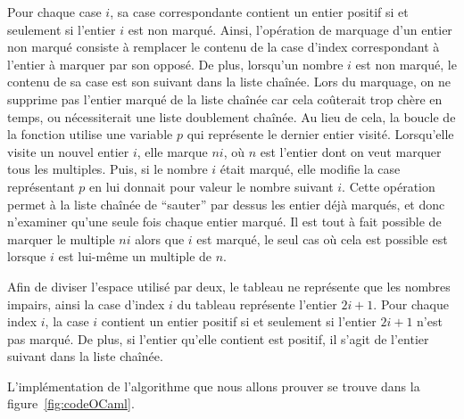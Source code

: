 \documentclass[a4paper]{easychair}
\begin{document}
Pour chaque case $i$, sa case correspondante contient un entier positif
si et seulement si l'entier $i$ est non marqué.
Ainsi, l'opération de marquage d'un entier non marqué consiste à remplacer le
contenu de la case d'index correspondant à l'entier à marquer par son opposé.
De plus, lorsqu'un nombre $i$ est non marqué, le contenu de sa case est son
suivant dans la liste chaînée.
Lors du marquage, on ne supprime pas l'entier marqué de la liste chaînée car
cela coûterait trop chère en temps, ou nécessiterait une liste doublement
chaînée. Au lieu de cela, la boucle de la fonction 
utilise une variable $p$ qui représente le dernier entier visité.
Lorsqu'elle visite un nouvel entier $i$, elle marque $ni$, où $n$ est
l'entier dont on veut marquer tous les multiples.
Puis, si le nombre $i$ était marqué, elle modifie la case représentant $p$ en lui
donnait pour valeur le nombre suivant $i$. Cette opération permet à la liste
chaînée de ``sauter'' par dessus les entier déjà marqués, et donc n'examiner
qu'une seule fois chaque entier marqué.
Il est tout à fait possible de marquer le multiple $ni$ alors que $i$ est marqué,
le seul cas où cela est possible est lorsque $i$ est lui-même un multiple de $n$.

Afin de diviser l'espace utilisé par deux, le tableau ne représente que les nombres
impairs, ainsi la case d'index $i$ du tableau représente l'entier $2i + 1$.
Pour chaque index $i$, la case $i$ contient un entier positif si et
seulement si l'entier $2i + 1$ n'est pas marqué.
De plus, si l'entier qu'elle contient est positif, il s'agit de l'entier suivant
dans la liste chaînée.

L'implémentation de l'algorithme que nous allons prouver se trouve dans la
figure~\ref{fig:codeOCaml}.
\end{document}
